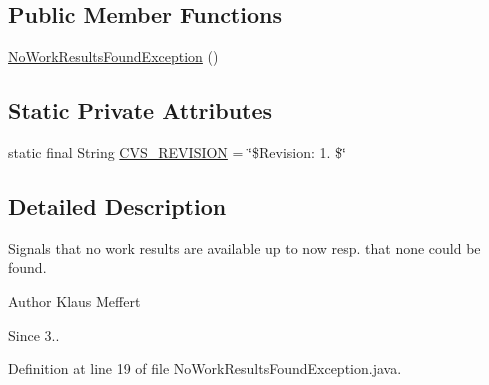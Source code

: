 \subsection*{Public Member Functions}
\begin{DoxyCompactItemize}
\item 
\hyperlink{classorg_1_1jgap_1_1distr_1_1grid_1_1common_1_1_no_work_results_found_exception_a193cc50e409a50ff5e03a0c0ba9f1cb1}{No\-Work\-Results\-Found\-Exception} ()
\end{DoxyCompactItemize}
\subsection*{Static Private Attributes}
\begin{DoxyCompactItemize}
\item 
static final String \hyperlink{classorg_1_1jgap_1_1distr_1_1grid_1_1common_1_1_no_work_results_found_exception_acf316455696cfa19ff78ac908c528de1}{C\-V\-S\-\_\-\-R\-E\-V\-I\-S\-I\-O\-N} = \char`\"{}\$Revision\-: 1. \$\char`\"{}
\end{DoxyCompactItemize}


\subsection{Detailed Description}
Signals that no work results are available up to now resp. that none could be found.

\begin{DoxyAuthor}{Author}
Klaus Meffert 
\end{DoxyAuthor}
\begin{DoxySince}{Since}
3.. 
\end{DoxySince}


Definition at line 19 of file No\-Work\-Results\-Found\-Exception.\-java.



